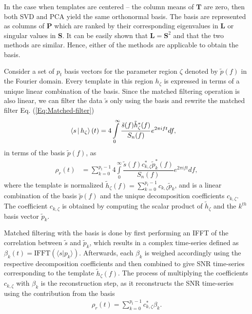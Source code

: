In the case when templates are centered -- the column means of $\textbf{T}$ are zero, then both SVD and PCA yield the same orthonormal basis. The basis are represented as columns of $\textbf{P}$ which are ranked by their corresponding eigenvalues in $\textbf{L}$ or singular values in $\textbf{S}$. It can be easily shown that $\textbf{L} = \textbf{S}^2$ and that the two methods are similar. Hence, either of the methods are applicable to obtain the basis. 

Consider a set of $p_t$ basis vectors for the parameter region $\zeta$ denoted by $\tilde{p}(f)$ in the Fourier domain. Every template in this region $h_{\zeta}$ is expressed in terms of a unique linear combination of the basis. Since the matched filtering operation is also linear, we can filter the data $\tilde{s}$ only using the basis and rewrite the matched filter Eq. (\ref{Eq:Matched-filter}) 
\begin{align}
    \label{IFFT}
    \Braket{s|h_{\zeta}}(t)  & = 4\int\limits_{0}^{\infty}\dfrac{\tilde{s}(f)\tilde{h}_{\zeta}^*(f)}{S_n(f)} e^{2\pi i ft}df,
\end{align}
in terms of the basis $\tilde{p}(f)$, as
\begin{align}
        \rho_r(t) &=  \sum \limits_{k=0}^{p_t-1} 4 \int\limits_{0}^{\infty}\dfrac{\tilde{s}(f)c_{k, \zeta}^*\tilde{p}_{k}^*(f)}{S_n(f)} e^{2\pi i ft}df, \label{basis_SNR}
\end{align}
where the template is normalized $\tilde{h}_{\zeta}(f) = \sum \limits_{k=0}^{p_t-1}c_{k, \zeta}\tilde{p}_{k}$, and is a linear combination of the basis $\tilde{p}(f)$ and the unique decomposition coefficients $c_{k, \zeta}$. The coefficient $c_{k, \zeta}$ is obtained by computing the scalar product of $\tilde{h}_{\zeta}$ and the $k^{th}$ basis vector $\tilde{p}_{k}$. 

Matched filtering with the basis is done by first performing an IFFT of the correlation between $\tilde{s}$ and $\tilde{p}_k$, which results in a complex time-series defined as $\beta_{k}(t) = \text{IFFT} (\langle s|p_{k} \rangle)$. Afterwards, each $\beta_k$ is weighed accordingly using the respective decomposition coefficients and then combined to give SNR time-series corresponding to the template $\tilde{h}_{\zeta}(f)$. The process of multiplying the coefficients $c_{k,\zeta}$ with $\beta_{k}$ is the reconstruction step, as it reconstructs the SNR time-series using the contribution from the basis
\begin{align}
    \rho_r(t) =  \sum \limits_{k=0}^{p_t-1} c^*_{k, \zeta} \beta_{k}. \label{Beta_eqn}
\end{align}

